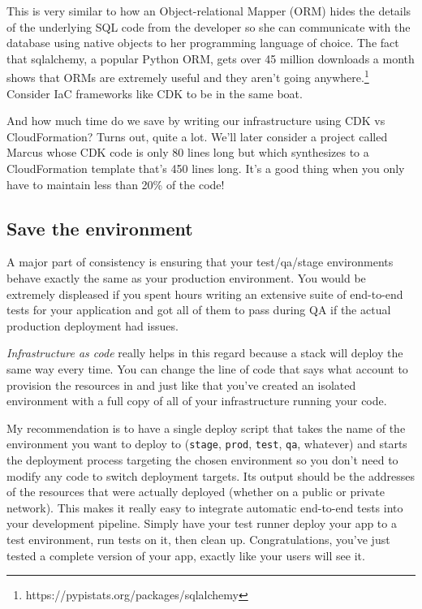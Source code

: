 \documentclass{article}
\newcommand{\noterm}[1]{\textit{#1}}
\newcommand{\term}[1]{\noterm{#1}\index{#1}}
\begin{document}
This is very similar to how an Object-relational Mapper (ORM) hides the details of the underlying SQL code from the developer so she can communicate with the database using native objects to her programming language of choice.
The fact that sqlalchemy, a popular Python ORM, gets over 45 million downloads a month shows that ORMs are extremely useful and they aren't going anywhere.\footnote{https://pypistats.org/packages/sqlalchemy}
Consider IaC frameworks like CDK to be in the same boat.

And how much time do we save by writing our infrastructure using CDK vs CloudFormation?
Turns out, quite a lot.
We'll later consider a project called Marcus whose CDK code is only 80 lines long but which synthesizes to a CloudFormation template that's 450 lines long.
It's a good thing when you only have to maintain less than 20\% of the code!

\subsection{Save the environment}

A major part of consistency is ensuring that your test/qa/stage environments behave exactly the same as your production environment.
You would be extremely displeased if you spent hours writing an extensive suite of end-to-end tests for your application and got all of them to pass during QA if the actual production deployment had issues.

\term{Infrastructure as code} really helps in this regard because a stack will deploy the same way every time.
You can change the line of code that says what account to provision the resources in and just like that you've created an isolated environment with a full copy of all of your infrastructure running your code.

My recommendation is to have a single deploy script that takes the name of the environment you want to deploy to (\texttt{stage}, \texttt{prod}, \texttt{test}, \texttt{qa}, whatever) and starts the deployment process targeting the chosen environment so you don't need to modify any code to switch deployment targets.
Its output should be the addresses of the resources that were actually deployed (whether on a public or private network).
This makes it really easy to integrate automatic end-to-end tests into your development pipeline.
Simply have your test runner deploy your app to a test environment, run tests on it, then clean up.
Congratulations, you've just tested a complete version of your app, exactly like your users will see it.
\end{document}
